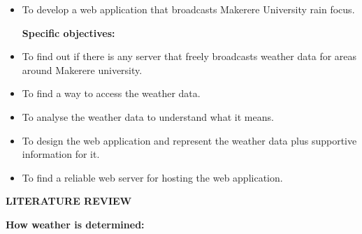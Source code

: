 \documentclass[12pt]{article}
\begin{document}
\begin{itemize}
	\item {\fontsize{13pt}{15.6pt}\selectfont To develop a web application that broadcasts Makerere University rain focus.\par}\par


\vspace{\baselineskip}
{\fontsize{13pt}{15.6pt}\selectfont \textbf{Specific objectives:}\par}\par

	\item {\fontsize{13pt}{15.6pt}\selectfont To find out if there is any server that freely broadcasts weather data for areas around Makerere university.\par}\par

	\item {\fontsize{13pt}{15.6pt}\selectfont To find a way to access the weather data.\par}\par

	\item {\fontsize{13pt}{15.6pt}\selectfont  To analyse the weather data to understand what it means.\par}\par

	\item {\fontsize{13pt}{15.6pt}\selectfont To design the web application and represent the weather data plus supportive information for it.\par}\par

	\item {\fontsize{13pt}{15.6pt}\selectfont To find a reliable web server for hosting the web application.\par}
\end{itemize}\par


\vspace{\baselineskip}
\begin{Center}
{\fontsize{13pt}{15.6pt}\selectfont \textbf{LITERATURE REVIEW}\par}
\end{Center}\par


\vspace{\baselineskip}
{\fontsize{13pt}{15.6pt}\selectfont \textbf{How weather is determined:}\par}\par
\end{document}
